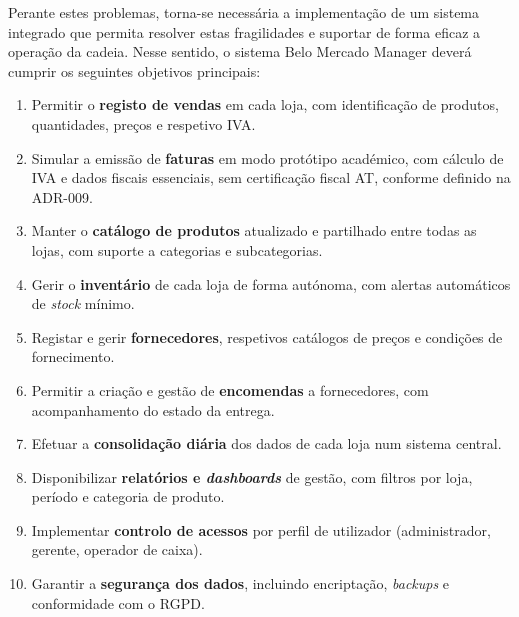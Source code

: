     Perante estes problemas, torna-se necessária a implementação de um sistema integrado que permita resolver estas fragilidades e suportar de forma eficaz a operação da cadeia. Nesse sentido, o sistema Belo Mercado Manager deverá cumprir os seguintes objetivos principais:

    \begin{enumerate}
    \item Permitir o \textbf{registo de vendas} em cada loja, com identificação de produtos, quantidades, preços e respetivo IVA.
    \item Simular a emissão de \textbf{faturas} em modo protótipo académico, com cálculo de IVA e dados fiscais essenciais, sem certificação fiscal AT, conforme definido na ADR-009.
    \item Manter o \textbf{catálogo de produtos} atualizado e partilhado entre todas as lojas, com suporte a categorias e subcategorias.
    \item Gerir o \textbf{inventário} de cada loja de forma autónoma, com alertas automáticos de \textit{stock} mínimo.
    \item Registar e gerir \textbf{fornecedores}, respetivos catálogos de preços e condições de fornecimento.
    \item Permitir a criação e gestão de \textbf{encomendas} a fornecedores, com acompanhamento do estado da entrega.
    \item Efetuar a \textbf{consolidação diária} dos dados de cada loja num sistema central.
    \item Disponibilizar \textbf{relatórios e \textit{dashboards}} de gestão, com filtros por loja, período e categoria de produto.
    \item Implementar \textbf{controlo de acessos} por perfil de utilizador (administrador, gerente, operador de caixa).
    \item Garantir a \textbf{segurança dos dados}, incluindo encriptação, \textit{backups} e conformidade com o RGPD.
    \end{enumerate}


